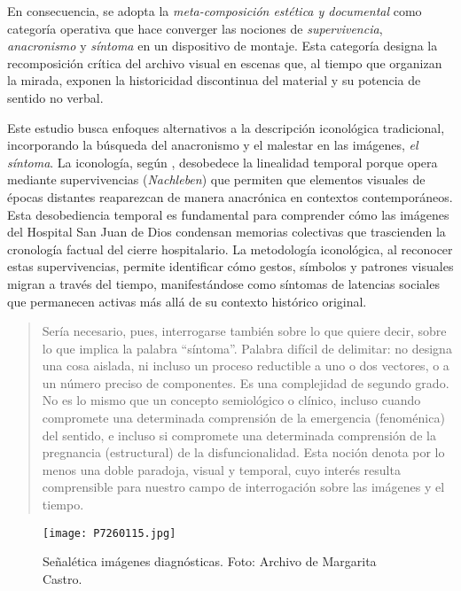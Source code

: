 \textcolor{edit30sept}{En consecuencia, se adopta la \textit{meta-composición estética y documental} como categoría operativa que hace converger las nociones de \textit{supervivencia}, \textit{anacronismo} y \textit{síntoma} en un dispositivo de montaje. Esta categoría designa la recomposición crítica del archivo visual en escenas que, al tiempo que organizan la mirada, exponen la historicidad discontinua del material y su potencia de sentido no verbal.}

\textcolor{edit30sept}{Este estudio busca enfoques alternativos a la descripción iconológica tradicional, incorporando la búsqueda del anacronismo y el malestar en las imágenes, \textit{el síntoma}. La iconología, según \parencite{Warburg2010}, desobedece la linealidad temporal porque opera mediante supervivencias (\textit{Nachleben}) que permiten que elementos visuales de épocas distantes reaparezcan de manera anacrónica en contextos contemporáneos. Esta desobediencia temporal es fundamental para comprender cómo las imágenes del Hospital San Juan de Dios condensan memorias colectivas que trascienden la cronología factual del cierre hospitalario. La metodología iconológica, al reconocer estas supervivencias, permite identificar cómo gestos, símbolos y patrones visuales migran a través del tiempo, manifestándose como síntomas de latencias sociales que permanecen activas más allá de su contexto histórico original.}

\begin{quote}
    Sería necesario, pues, interrogarse también sobre lo que quiere decir, sobre lo que implica la palabra “síntoma”. Palabra difícil de delimitar: no designa una cosa aislada, ni incluso un proceso reductible a uno o dos vectores, o a un número preciso de componentes. Es una complejidad de segundo grado. No es lo mismo que un concepto semiológico o clínico, incluso cuando compromete una determinada comprensión de la emergencia (fenoménica) del sentido, e incluso si compromete una determinada comprensión de la pregnancia (estructural) de la disfuncionalidad. Esta noción denota por lo menos una doble paradoja, visual y temporal, cuyo interés resulta comprensible para nuestro campo de interrogación sobre las imágenes y el tiempo. \parencite[p. 63]{DidiHuberman2011}
\end{quote}

\begin{figure}[htbp]
    \centering
    \texttt{[image: P7260115.jpg]}
    \caption{Señalética imágenes diagnósticas. Foto: Archivo de Margarita Castro.}
    \label{fig:senaletica_imagenes_diagnosticas}
\end{figure}

